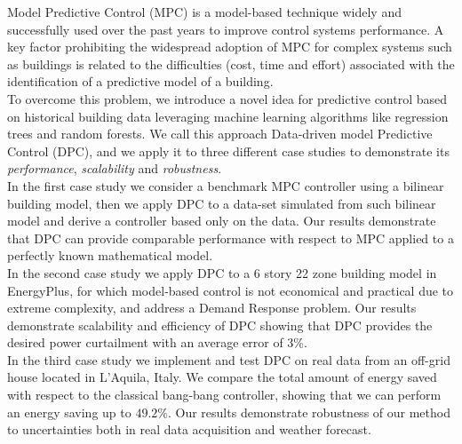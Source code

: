 \textcolor[rgb]{0,0,1}{Model Predictive Control (MPC) is a model-based technique widely and successfully used over the past years to improve control systems performance. A key factor prohibiting the widespread adoption of MPC for complex systems such as buildings is related to the difficulties (cost, time and effort) associated with the identification of a predictive model of a building.\\
To overcome this problem, we introduce a novel idea for predictive control based on historical building data leveraging machine learning algorithms like regression trees and random forests. We call this approach Data-driven model Predictive Control (DPC), and we apply it to three different case studies to demonstrate its \textit{performance}, \textit{scalability} and \textit{robustness}.\\
In the first case study we consider a benchmark MPC controller using a bilinear building model, then we apply DPC to a data-set simulated from such bilinear model and derive a controller based only on the data. Our results demonstrate that DPC can provide comparable performance with respect to MPC applied to a perfectly known mathematical model.\\
In the second case study we apply DPC to a 6 story 22 zone building model in EnergyPlus, for which model-based control is not economical and practical due to extreme complexity, and address a Demand Response problem. Our results demonstrate scalability and efficiency of DPC showing that DPC provides the desired power curtailment with an average error of 3\%.\\
In the third case study  we implement and test DPC on real data from an off-grid house located in L'Aquila, Italy.
We compare the total amount of energy saved with respect to the classical bang-bang controller, showing that we can perform an energy saving up
to $49.2\%$.
Our results demonstrate robustness of our method to uncertainties both in real data acquisition and weather forecast.}

